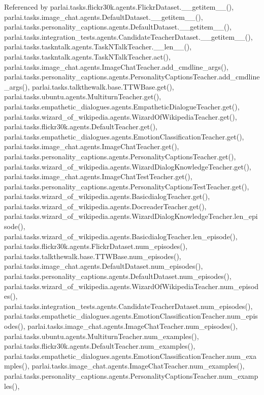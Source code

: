 Referenced by parlai.\+tasks.\+flickr30k.\+agents.\+Flickr\+Dataset.\+\_\+\+\_\+getitem\+\_\+\+\_\+(), parlai.\+tasks.\+image\+\_\+chat.\+agents.\+Default\+Dataset.\+\_\+\+\_\+getitem\+\_\+\+\_\+(), parlai.\+tasks.\+personality\+\_\+captions.\+agents.\+Default\+Dataset.\+\_\+\+\_\+getitem\+\_\+\+\_\+(), parlai.\+tasks.\+integration\+\_\+tests.\+agents.\+Candidate\+Teacher\+Dataset.\+\_\+\+\_\+getitem\+\_\+\+\_\+(), parlai.\+tasks.\+taskntalk.\+agents.\+Task\+N\+Talk\+Teacher.\+\_\+\+\_\+len\+\_\+\+\_\+(), parlai.\+tasks.\+taskntalk.\+agents.\+Task\+N\+Talk\+Teacher.\+act(), parlai.\+tasks.\+image\+\_\+chat.\+agents.\+Image\+Chat\+Teacher.\+add\+\_\+cmdline\+\_\+args(), parlai.\+tasks.\+personality\+\_\+captions.\+agents.\+Personality\+Captions\+Teacher.\+add\+\_\+cmdline\+\_\+args(), parlai.\+tasks.\+talkthewalk.\+base.\+T\+T\+W\+Base.\+get(), parlai.\+tasks.\+ubuntu.\+agents.\+Multiturn\+Teacher.\+get(), parlai.\+tasks.\+empathetic\+\_\+dialogues.\+agents.\+Empathetic\+Dialogue\+Teacher.\+get(), parlai.\+tasks.\+wizard\+\_\+of\+\_\+wikipedia.\+agents.\+Wizard\+Of\+Wikipedia\+Teacher.\+get(), parlai.\+tasks.\+flickr30k.\+agents.\+Default\+Teacher.\+get(), parlai.\+tasks.\+empathetic\+\_\+dialogues.\+agents.\+Emotion\+Classification\+Teacher.\+get(), parlai.\+tasks.\+image\+\_\+chat.\+agents.\+Image\+Chat\+Teacher.\+get(), parlai.\+tasks.\+personality\+\_\+captions.\+agents.\+Personality\+Captions\+Teacher.\+get(), parlai.\+tasks.\+wizard\+\_\+of\+\_\+wikipedia.\+agents.\+Wizard\+Dialog\+Knowledge\+Teacher.\+get(), parlai.\+tasks.\+image\+\_\+chat.\+agents.\+Image\+Chat\+Test\+Teacher.\+get(), parlai.\+tasks.\+personality\+\_\+captions.\+agents.\+Personality\+Captions\+Test\+Teacher.\+get(), parlai.\+tasks.\+wizard\+\_\+of\+\_\+wikipedia.\+agents.\+Basicdialog\+Teacher.\+get(), parlai.\+tasks.\+wizard\+\_\+of\+\_\+wikipedia.\+agents.\+Docreader\+Teacher.\+get(), parlai.\+tasks.\+wizard\+\_\+of\+\_\+wikipedia.\+agents.\+Wizard\+Dialog\+Knowledge\+Teacher.\+len\+\_\+episode(), parlai.\+tasks.\+wizard\+\_\+of\+\_\+wikipedia.\+agents.\+Basicdialog\+Teacher.\+len\+\_\+episode(), parlai.\+tasks.\+flickr30k.\+agents.\+Flickr\+Dataset.\+num\+\_\+episodes(), parlai.\+tasks.\+talkthewalk.\+base.\+T\+T\+W\+Base.\+num\+\_\+episodes(), parlai.\+tasks.\+image\+\_\+chat.\+agents.\+Default\+Dataset.\+num\+\_\+episodes(), parlai.\+tasks.\+personality\+\_\+captions.\+agents.\+Default\+Dataset.\+num\+\_\+episodes(), parlai.\+tasks.\+wizard\+\_\+of\+\_\+wikipedia.\+agents.\+Wizard\+Of\+Wikipedia\+Teacher.\+num\+\_\+episodes(), parlai.\+tasks.\+integration\+\_\+tests.\+agents.\+Candidate\+Teacher\+Dataset.\+num\+\_\+episodes(), parlai.\+tasks.\+empathetic\+\_\+dialogues.\+agents.\+Emotion\+Classification\+Teacher.\+num\+\_\+episodes(), parlai.\+tasks.\+image\+\_\+chat.\+agents.\+Image\+Chat\+Teacher.\+num\+\_\+episodes(), parlai.\+tasks.\+ubuntu.\+agents.\+Multiturn\+Teacher.\+num\+\_\+examples(), parlai.\+tasks.\+flickr30k.\+agents.\+Default\+Teacher.\+num\+\_\+examples(), parlai.\+tasks.\+empathetic\+\_\+dialogues.\+agents.\+Emotion\+Classification\+Teacher.\+num\+\_\+examples(), parlai.\+tasks.\+image\+\_\+chat.\+agents.\+Image\+Chat\+Teacher.\+num\+\_\+examples(), parlai.\+tasks.\+personality\+\_\+captions.\+agents.\+Personality\+Captions\+Teacher.\+num\+\_\+examples(), 